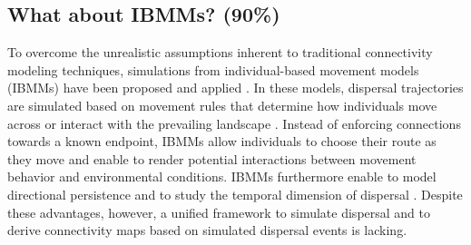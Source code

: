 \documentclass[abstract=on,10pt,a4paper,bibliography=totocnumbered]{article}
\begin{document}
\subsection{What about IBMMs? (90\%)}
To overcome the unrealistic assumptions inherent to traditional connectivity
modeling techniques, simulations from individual-based movement models (IBMMs)
have been proposed and applied \citep{Diniz.2020}. In these models, dispersal
trajectories are simulated based on movement rules that determine how
individuals move across or interact with the prevailing landscape
\citep{Gustafson.1996, Gardner.2004, Graf.2007, KramerSchadt.2004, Revilla.2004,
Revilla.2008, Kanagaraj.2013, Clark.2015, Allen.2016, Hauenstein.2019,
Zeller.2020, Vasudev.2021}. Instead of enforcing connections towards a known
endpoint, IBMMs allow individuals to choose their route as they move and enable
to render potential interactions between movement behavior and environmental
conditions. IBMMs furthermore enable to model directional persistence and to
study the temporal dimension of dispersal \citep{Diniz.2020}. Despite these
advantages, however, a unified framework to simulate dispersal and to derive
connectivity maps based on simulated dispersal events is lacking.

\end{document}
